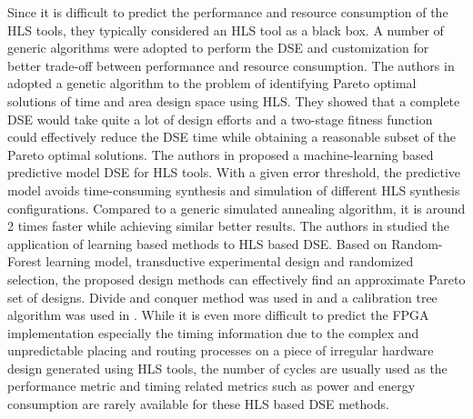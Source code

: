 Since it is difficult to predict the performance and resource consumption of the HLS tools, they typically considered an HLS tool as a black box. A number of generic algorithms were adopted to perform the DSE and customization for better trade-off between performance and resource consumption. The authors in \cite{holzer2007design} adopted a genetic algorithm to the problem of identifying Pareto optimal solutions of time and area design space using HLS. They showed that a complete DSE would take quite a lot of design efforts and a two-stage fitness function could effectively reduce the DSE time while obtaining a reasonable subset of the Pareto optimal solutions. The authors in \cite{schafer2012machine} proposed a machine-learning based predictive model DSE for HLS tools. With a given error threshold, the predictive model avoids time-consuming synthesis and simulation of different HLS synthesis configurations. Compared to a generic simulated annealing algorithm, it is around 2 times faster while achieving similar better results. The authors in \cite{liu2013learning} studied the application of learning based methods to HLS based DSE. Based on Random-Forest learning model, transductive experimental design and randomized selection, the proposed design methods can effectively find an approximate Pareto set of designs. Divide and conquer method was used in \cite{schafer2012divide} and a calibration tree algorithm was used in \cite{kurek2014automating}. While it is even more difficult to predict the FPGA implementation especially the timing information due to the complex and unpredictable placing and routing processes on a piece of irregular hardware design generated using HLS tools, the number of cycles are usually used as the performance metric and timing related metrics such as power and energy consumption are rarely available for these HLS based DSE methods.

